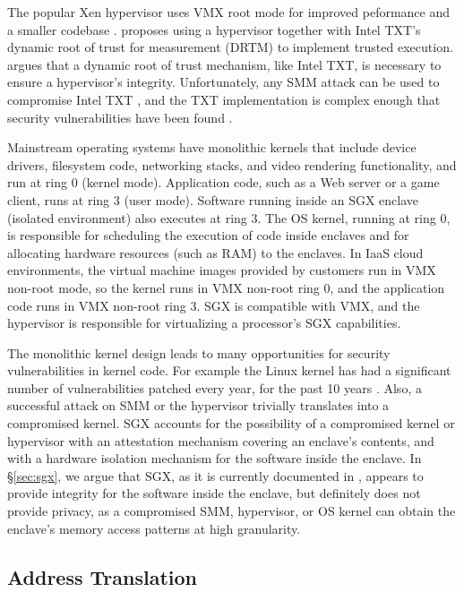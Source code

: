 The popular Xen hypervisor uses VMX root mode for improved peformance and a
smaller codebase \cite{zhang2008xen}. \cite{mccune2010trustvisor} proposes
using a hypervisor together with Intel TXT's dynamic root of trust for
measurement (DRTM) to implement trusted execution.
\cite{vasudevan2010requirements} argues that a dynamic root of trust mechanism,
like Intel TXT, is necessary to ensure a hypervisor's integrity. Unfortunately,
any SMM attack can be used to compromise Intel TXT \cite{wojtczuk2009txt}, and
the TXT implementation is complex enough that security vulnerabilities have
been found \cite{wojtczuk2009txt2} \cite{wojtczuk2011txt}.

Mainstream operating systems have monolithic kernels that include device
drivers, filesystem code, networking stacks, and video rendering functionality,
and run at ring 0 (kernel mode). Application code, such as a Web server or
a game client, runs at ring 3 (user mode). Software running inside an SGX
enclave (isolated environment) also executes at ring 3. The OS kernel, running
at ring 0, is responsible for scheduling the execution of code inside enclaves
and for allocating hardware resources (such as RAM) to the enclaves. In IaaS
cloud environments, the virtual machine images provided by customers run in VMX
non-root mode, so the kernel runs in VMX non-root ring 0, and the application
code runs in VMX non-root ring 3. SGX is compatible with VMX, and the
hypervisor is responsible for virtualizing a processor's SGX capabilities.

The monolithic kernel design leads to many opportunities for security
vulnerabilities in kernel code. For example the Linux kernel has had a
significant number of vulnerabilities patched every year, for the past 10 years
\cite{cvedetails2014linux} \cite{chen2011linux}. Also, a successful attack on
SMM or the hypervisor trivially translates into a compromised kernel. SGX
accounts for the possibility of a compromised kernel or hypervisor with an
attestation mechanism covering an enclave's contents, and with a hardware
isolation mechanism for the software inside the enclave. In \S \ref{sec:sgx},
we argue that SGX, as it is currently documented in \cite{intel2013sgxmanual},
appears to provide integrity for the software inside the enclave, but
definitely does not provide privacy, as a compromised SMM, hypervisor, or OS
kernel can obtain the enclave's memory access patterns at high granularity.


\subsection{Address Translation}
\label{sec:paging}


